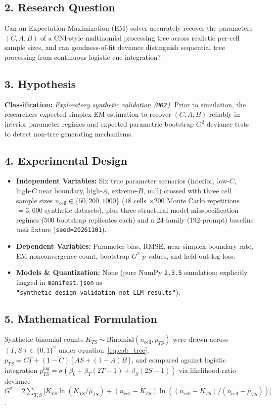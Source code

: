\subsection*{2. Research Question}
Can an Expectation-Maximization (EM) solver accurately recover the parameters $(C, A, B)$ of a CNI-style multinomial processing tree across realistic per-cell sample sizes, and can goodness-of-fit deviance distinguish sequential tree processing from continuous logistic cue integration?

\subsection*{3. Hypothesis}
\textbf{Classification:} \emph{Exploratory synthetic validation (\texttt{H02}).} Prior to simulation, the researchers expected simplex EM estimation to recover $(C, A, B)$ reliably in interior parameter regimes and expected parametric bootstrap $G^2$ deviance tests to detect non-tree generating mechanisms.

\subsection*{4. Experimental Design}
\begin{itemize}
  \item \textbf{Independent Variables:} Six true parameter scenarios (interior, low-$C$, high-$C$ near boundary, high-$A$, extreme-$B$, null) crossed with three cell sample sizes $n_{\mathrm{cell}} \in \{50, 200, 1000\}$ ($18$ cells $\times 200$ Monte Carlo repetitions $= 3{,}600$ synthetic datasets), plus three structural model-misspecification regimes ($500$ bootstrap replicates each) and a $24$-family ($192$-prompt) baseline task fixture (\texttt{seed=20261101}).
  \item \textbf{Dependent Variables:} Parameter bias, RMSE, near-simplex-boundary rate, EM nonconvergence count, bootstrap $G^2$ $p$-values, and held-out log-loss.
  \item \textbf{Models \& Quantization:} None (pure NumPy \texttt{2.3.5} simulation; explicitly flagged in \texttt{manifest.json} as \texttt{"synthetic\_design\_validation\_not\_LLM\_results"}).
\end{itemize}

\subsection*{5. Mathematical Formulation}
Synthetic binomial counts $K_{TS} \sim \mathrm{Binomial}(n_{\mathrm{cell}}, p_{TS})$ were drawn across $(T,S) \in \{0,1\}^2$ under equation~\eqref{eq:cab_tree}, $p_{TS} = C T + (1-C)[A S + (1-A)B]$, and compared against logistic integration $p_{TS}^{\mathrm{log}} = \sigma(\beta_0 + \beta_T(2T-1) + \beta_S(2S-1))$ via likelihood-ratio deviance $G^2 = 2\sum_{T,S} \bigl[K_{TS}\ln(K_{TS}/\hat{\mu}_{TS}) + (n_{\mathrm{cell}}-K_{TS})\ln((n_{\mathrm{cell}}-K_{TS})/(n_{\mathrm{cell}}-\hat{\mu}_{TS}))\bigr]$.

